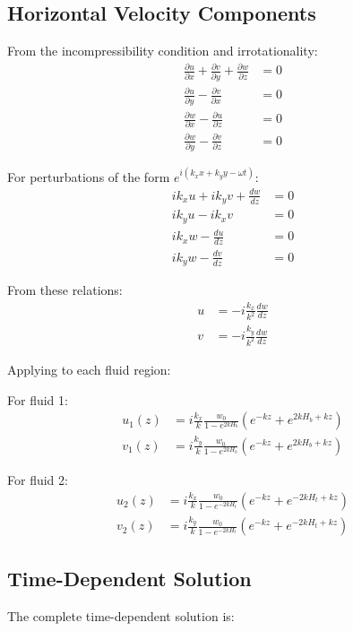 \documentclass[12pt,a4paper]{article}
\begin{document}
\subsection{Horizontal Velocity Components}
From the incompressibility condition and irrotationality:
\begin{align}
\frac{\partial u}{\partial x} + \frac{\partial v}{\partial y} + \frac{\partial w}{\partial z} &= 0 \\
\frac{\partial u}{\partial y} - \frac{\partial v}{\partial x} &= 0 \\
\frac{\partial w}{\partial x} - \frac{\partial u}{\partial z} &= 0 \\
\frac{\partial w}{\partial y} - \frac{\partial v}{\partial z} &= 0
\end{align}

For perturbations of the form $e^{i(k_x x + k_y y - \omega t)}$:
\begin{align}
ik_xu + ik_yv + \frac{dw}{dz} &= 0 \\
ik_yu - ik_xv &= 0 \\
ik_xw - \frac{du}{dz} &= 0 \\
ik_yw - \frac{dv}{dz} &= 0
\end{align}

From these relations:
\begin{align}
u &= -i\frac{k_x}{k^2}\frac{dw}{dz} \\
v &= -i\frac{k_y}{k^2}\frac{dw}{dz}
\end{align}

Applying to each fluid region:

For fluid 1:
\begin{align}
u_1(z) &= i\frac{k_x}{k}\frac{w_0}{1 - e^{2kH_b}}(e^{-kz} + e^{2kH_b+kz}) \\
v_1(z) &= i\frac{k_y}{k}\frac{w_0}{1 - e^{2kH_b}}(e^{-kz} + e^{2kH_b+kz})
\end{align}

For fluid 2:
\begin{align}
u_2(z) &= i\frac{k_x}{k}\frac{w_0}{1 - e^{-2kH_t}}(e^{-kz} + e^{-2kH_t+kz}) \\
v_2(z) &= i\frac{k_y}{k}\frac{w_0}{1 - e^{-2kH_t}}(e^{-kz} + e^{-2kH_t+kz})
\end{align}

\subsection{Time-Dependent Solution}
The complete time-dependent solution is:
\end{document}
